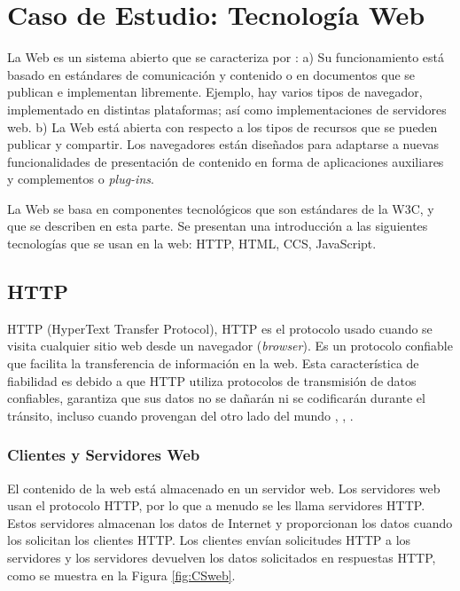 \section{Caso de Estudio: Tecnología Web}
\label{sec:caso-estudio:web}

La Web es un sistema abierto que se  caracteriza por : a) Su funcionamiento está basado en estándares de comunicación y contenido o en documentos que se publican e implementan libremente. Ejemplo, hay varios tipos de navegador,  implementado en distintas plataformas; así como  implementaciones de servidores web. b) La Web está abierta con respecto a los tipos de \gls{recursos} que se pueden publicar y compartir. Los navegadores están diseñados para adaptarse a nuevas funcionalidades de presentación de contenido en forma de aplicaciones auxiliares y complementos o \textit{plug-ins}.

La Web se basa en  componentes tecnológicos que son  estándares de la W3C,  y que se describen en esta parte. Se presentan una introducción a las siguientes tecnolog\'ias que se usan  en la web: HTTP, HTML, CCS, JavaScript.

\subsection{HTTP}    
HTTP (HyperText Transfer Protocol), \gls{HTTP} es el protocolo usado cuando se visita cualquier sitio web desde un navegador (\textit{browser}). Es un protocolo confiable que facilita la transferencia de información en la web. Esta característica de fiabilidad es  debido a que HTTP utiliza protocolos de transmisión de datos confiables, garantiza que sus datos no se dañarán ni se codificarán durante el tránsito, incluso cuando provengan del otro lado del mundo , ,  .


	\subsubsection{Clientes y Servidores Web}      
	El contenido de la  web está almacenado en un \gls{servidor web}. Los servidores web usan el protocolo HTTP, por lo que a menudo se les llama servidores HTTP. Estos servidores almacenan los datos de Internet y proporcionan los datos cuando los solicitan los clientes HTTP. Los clientes envían solicitudes HTTP a los servidores y los servidores devuelven los datos solicitados en respuestas HTTP, como se muestra en la Figura \ref{fig:CSweb}. 
	
